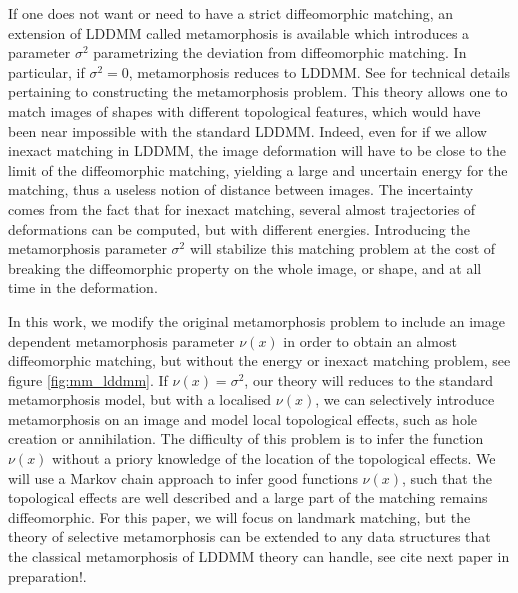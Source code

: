 \documentclass[runningheads]{llncs}
\begin{document}
If one does not want or need to have a strict diffeomorphic matching, an
extension of LDDMM called metamorphosis
\cite{trouve2005metamorphoses,holm2009euler} is available which introduces a
parameter $\sigma^2$ parametrizing the deviation from diffeomorphic matching.
In particular, if $\sigma^2=0$, metamorphosis reduces to LDDMM.  See
\cite{trouve1995infinite,trouve2005local,miller2001group} for technical details
pertaining to constructing the metamorphosis problem. This theory allows one to
match images of shapes with different topological features, which would have
been near impossible with the standard LDDMM.  Indeed, even for if we allow
inexact matching in LDDMM, the image deformation will have to be close to the
limit of the diffeomorphic matching, yielding a large and uncertain energy for
the matching, thus a useless notion of distance between images.  The incertainty
comes from the fact that for inexact matching, several almost trajectories of
deformations can be computed, but with different energies.  Introducing the
metamorphosis parameter $\sigma^2$ will stabilize this matching problem at the
cost of breaking the diffeomorphic property on the whole image, or shape, and at
all time in the deformation. 

In this work, we modify the original metamorphosis problem to include an image
dependent metamorphosis parameter $\nu(x)$ in order to obtain an almost
diffeomorphic matching, but without the energy or inexact matching problem, see
figure \ref{fig:mm_lddmm}.  If $\nu(x) = \sigma^2$, our theory will reduces to
the standard metamorphosis model, but with a localised $\nu(x)$, we can
selectively introduce metamorphosis on an image and model local topological
effects, such as hole creation or annihilation.  The difficulty of this problem
is to infer the function $\nu(x)$ without a priory knowledge of the location of
the topological effects.  We will use a Markov chain approach to infer good
functions $\nu(x)$, such that the topological effects are well described and a
large part of the matching remains diffeomorphic.  For this paper, we will focus
on landmark matching, but the theory of selective metamorphosis can be extended
to any data structures that the classical metamorphosis of LDDMM theory can
handle, see {\color{red} cite next paper in preparation!}. 
\end{document}

